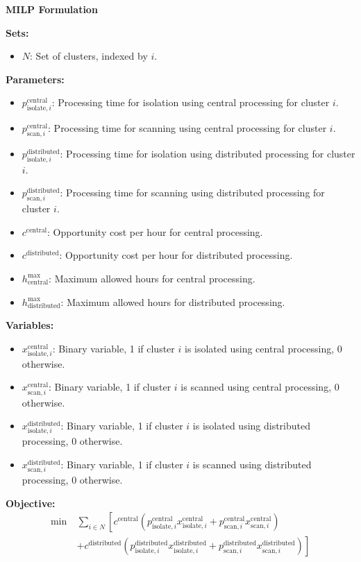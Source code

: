 \documentclass{article}
\begin{document}
\textbf{MILP Formulation}

\textbf{Sets:}
\begin{itemize}
    \item $N$: Set of clusters, indexed by $i$.
\end{itemize}

\textbf{Parameters:}
\begin{itemize}
    \item $p^{\text{central}}_{\text{isolate},i}$: Processing time for isolation using central processing for cluster $i$.
    \item $p^{\text{central}}_{\text{scan},i}$: Processing time for scanning using central processing for cluster $i$.
    \item $p^{\text{distributed}}_{\text{isolate},i}$: Processing time for isolation using distributed processing for cluster $i$.
    \item $p^{\text{distributed}}_{\text{scan},i}$: Processing time for scanning using distributed processing for cluster $i$.
    \item $c^{\text{central}}$: Opportunity cost per hour for central processing.
    \item $c^{\text{distributed}}$: Opportunity cost per hour for distributed processing.
    \item $h^{\text{max}}_{\text{central}}$: Maximum allowed hours for central processing.
    \item $h^{\text{max}}_{\text{distributed}}$: Maximum allowed hours for distributed processing.
\end{itemize}

\textbf{Variables:}
\begin{itemize}
    \item $x^{\text{central}}_{\text{isolate},i}$: Binary variable, 1 if cluster $i$ is isolated using central processing, 0 otherwise.
    \item $x^{\text{central}}_{\text{scan},i}$: Binary variable, 1 if cluster $i$ is scanned using central processing, 0 otherwise.
    \item $x^{\text{distributed}}_{\text{isolate},i}$: Binary variable, 1 if cluster $i$ is isolated using distributed processing, 0 otherwise.
    \item $x^{\text{distributed}}_{\text{scan},i}$: Binary variable, 1 if cluster $i$ is scanned using distributed processing, 0 otherwise.
\end{itemize}

\textbf{Objective:}
\begin{align}
    \min \ & \sum_{i \in N} \left[ c^{\text{central}} \left( p^{\text{central}}_{\text{isolate},i} x^{\text{central}}_{\text{isolate},i} + p^{\text{central}}_{\text{scan},i} x^{\text{central}}_{\text{scan},i} \right) \right. \nonumber \\
    & \left. + c^{\text{distributed}} \left( p^{\text{distributed}}_{\text{isolate},i} x^{\text{distributed}}_{\text{isolate},i} + p^{\text{distributed}}_{\text{scan},i} x^{\text{distributed}}_{\text{scan},i} \right) \right]
\end{align}
\end{document}
